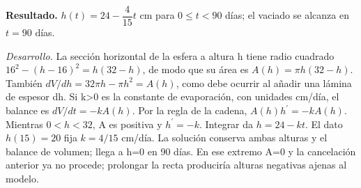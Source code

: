 \noindent\textbf{Resultado.} $h(t)=24-\dfrac4{15}t$ cm para $0\le t<90$ días; el vaciado se alcanza en $t=90$ días.

\noindent\textit{Desarrollo.} La sección horizontal de la esfera a altura h tiene radio cuadrado $16^2-(h-16)^2=h(32-h)$, de modo que su área es $A(h)=\pi h(32-h)$. También $dV/dh=32\pi h-\pi h^2=A(h)$, como debe ocurrir al añadir una lámina de espesor dh. Si k>0 es la constante de evaporación, con unidades cm/día, el balance es $dV/dt=-kA(h)$. Por la regla de la cadena, $A(h)h^{\prime}=-kA(h)$. Mientras $0<h<32$, A es positiva y $h^{\prime}=-k$. Integrar da $h=24-kt$. El dato $h(15)=20$ fija $k=4/15$ cm/día. La solución conserva ambas alturas y el balance de volumen; llega a h=0 en 90 días. En ese extremo A=0 y la cancelación anterior ya no procede; prolongar la recta produciría alturas negativas ajenas al modelo.
